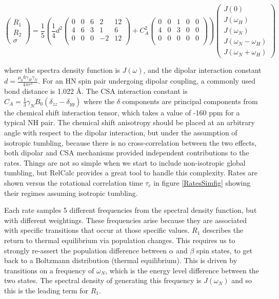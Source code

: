 \documentclass[showkeys,aps,prb,prepreint,amssymb, amsmath,nobibnotes]{article}
\begin{document}
\begin{equation}
    \left(\begin{array}{c} R_1 \\R_2 \\ \sigma \end{array}\right)
    =
  \frac{1}{5} \left(\frac{1}{4}d^2 
   \left(\begin{array}{ccccc}
     0 & 0 & 6 & 2 & 12 \\
     4 & 6 & 3 & 1 & 6 \\
     0 & 0 & 0 &-2 & 12 \\
   \end{array}\right)
   +
   C_A^2
      \left(\begin{array}{ccccc}
     0 & 0 & 1 & 0 & 0 \\
     4 & 0 & 3 & 0 & 0 \\
     0 & 0 & 0 & 0 & 0 \\
   \end{array}\right)
   \right)
   \left(\begin{array}{c} J(0) \\ J(\omega_H)  \\J(\omega_N) \\  J(\omega_N-\omega_H) \\ J(\omega_N+\omega_H) \end{array}\right)
   \label{eqAll}
  \end{equation}

where the spectra density function is $J(\omega)$, and the dipolar interaction constant $d=\frac{\mu_0 \hbar \gamma_H\gamma_N}{4\pi r^3}$. For an HN spin pair undergoing dipolar coupling, a commonly used bond distance is 1.022 \AA. The CSA interaction constant is $C_A=\frac{1}{3}\gamma_NB_0(\delta_{zz}-\delta_{yy})$ where the $\delta$ components are principal components from the chemical shift interaction tensor, which takes a value of -160 ppm for a typical NH pair. The chemical shift anisotropy should be placed at an arbitrary angle with respect to the dipolar interaction, but under the assumption of isotropic tumbling, because there is no cross-correlation between the two effects, both dipolar and CSA mechanisms provided independent contributions to the rates. Things are not so simple when we start to include non-isotropic global tumbling, but RelCalc provides a great tool to handle this complexity. Rates are shown versus the rotational correlation time $\tau_c$ in figure \ref{RatesSimfig} showing their regimes assuming isotropic tumbling.

Each rate samples 5 different frequencies from the spectral density function, but with different weightings. These frequencies arise because they are associated with specific transitions that occur at those specific values. $R_1$ describes the return to thermal equilibrium via population changes. This requires us to strongly re-assert the population difference between $\alpha$ and $\beta$ spin states, to get back to a Boltzmann distribution (thermal equilibrium). This is driven by transitions on a frequency of $\omega_N$, which is the energy level difference between the two states. The spectral density of generating this frequency is $J(\omega_N)$ and so this is the leading term for $R_1$.
\end{document}
